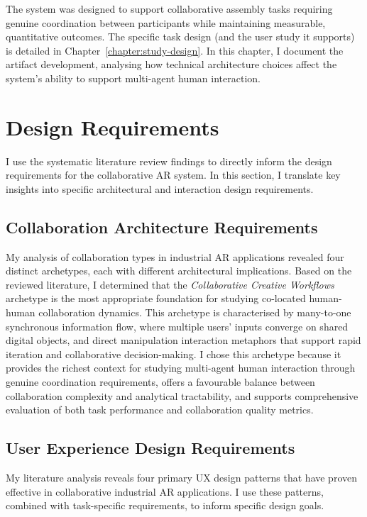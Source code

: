 The system was designed to support collaborative assembly tasks requiring genuine coordination between participants while maintaining measurable, quantitative outcomes. The specific task design (and the user study it supports) is detailed in Chapter~\ref{chapter:study-design}. In this chapter, I document the artifact development, analysing how technical architecture choices affect the system's ability to support multi-agent human interaction.

\section{Design Requirements}

I use the systematic literature review findings to directly inform the design requirements for the collaborative AR system. In this section, I translate key insights into specific architectural and interaction design requirements.


\subsection{Collaboration Architecture Requirements}
My analysis of collaboration types in industrial AR applications revealed four distinct archetypes, each with different architectural implications. Based on the reviewed literature, I determined that the \emph{Collaborative Creative Workflows} archetype is the most appropriate foundation for studying co-located human-human collaboration dynamics. This archetype is characterised by many-to-one synchronous information flow, where multiple users' inputs converge on shared digital objects, and direct manipulation interaction metaphors that support rapid iteration and collaborative decision-making.
I chose this archetype because it provides the richest context for studying multi-agent human interaction through genuine coordination requirements, offers a favourable balance between collaboration complexity and analytical tractability, and supports comprehensive evaluation of both task performance and collaboration quality metrics.

\subsection{User Experience Design Requirements}

My literature analysis reveals four primary UX design patterns that have proven effective in collaborative industrial AR applications. I use these patterns, combined with task-specific requirements, to inform specific design goals.

